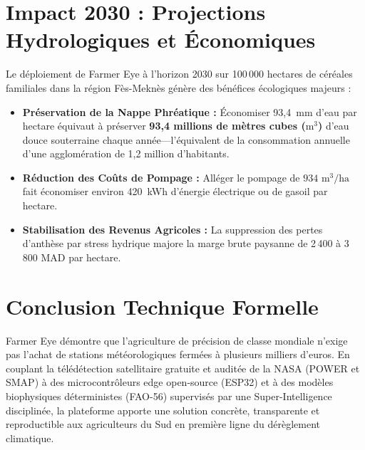 \documentclass[11pt,a4paper,oneside]{report}
\begin{document}
\section{Impact 2030 : Projections Hydrologiques et Économiques}
Le déploiement de Farmer Eye à l'horizon 2030 sur 100\,000 hectares de céréales familiales dans la région Fès-Meknès génère des bénéfices écologiques majeurs :
\begin{itemize}[leftmargin=*]
    \item \textbf{Préservation de la Nappe Phréatique :} Économiser 93,4~mm d'eau par hectare équivaut à préserver \textbf{93,4 millions de mètres cubes ($\text{m}^3$)} d'eau douce souterraine chaque année—l'équivalent de la consommation annuelle d'une agglomération de 1,2 million d'habitants.
    \item \textbf{Réduction des Coûts de Pompage :} Alléger le pompage de $934\text{ m}^3/\text{ha}$ fait économiser environ 420~kWh d'énergie électrique ou de gasoil par hectare.
    \item \textbf{Stabilisation des Revenus Agricoles :} La suppression des pertes d'anthèse par stress hydrique majore la marge brute paysanne de 2\,400 à 3\,800 MAD par hectare.
\end{itemize}

\section{Conclusion Technique Formelle}
Farmer Eye démontre que l'agriculture de précision de classe mondiale n'exige pas l'achat de stations météorologiques fermées à plusieurs milliers d'euros. En couplant la télédétection satellitaire gratuite et auditée de la NASA (POWER et SMAP) à des microcontrôleurs edge open-source (ESP32) et à des modèles biophysiques déterministes (FAO-56) supervisés par une Super-Intelligence disciplinée, la plateforme apporte une solution concrète, transparente et reproductible aux agriculteurs du Sud en première ligne du dérèglement climatique.
\end{document}
